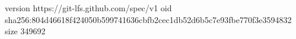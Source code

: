 version https://git-lfs.github.com/spec/v1
oid sha256:804d46618f424050b599741636cbfb2cec1db52d6b5c7e93fbe770f3e3594832
size 349692
